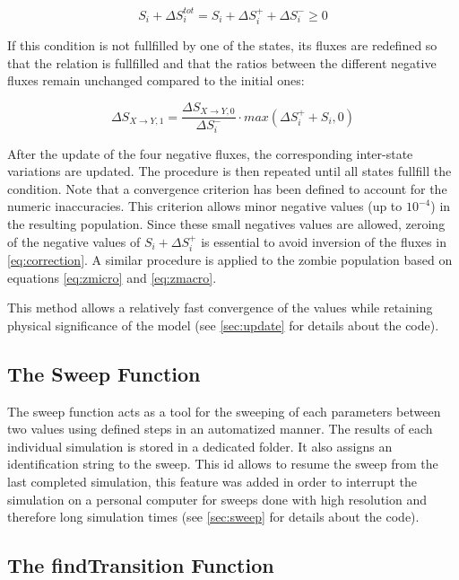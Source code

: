 \documentclass[11pt]{article} %
\begin{document}
\bigskip
\begin{equation} \label{eq:condition}
S_i + \Delta S_i^{tot} = S_i + \Delta S_i^+ + \Delta S_i^- \geq 0
\end{equation}
\bigskip

If this condition is not fullfilled by one of the states, its fluxes are redefined so that the relation is fullfilled and that the ratios between the different negative fluxes remain unchanged compared to the initial ones:

\bigskip
\begin{equation} \label{eq:correction}
\Delta S_{X\rightarrow Y,1} = \frac{\Delta S_{X\rightarrow Y,0}}{\Delta S_i^-}\cdot max(\Delta S_i^+ + S_i, 0)
\end{equation}
\bigskip

After the update of the four negative fluxes, the corresponding inter-state variations are updated. The procedure is then repeated until all states fullfill the condition. Note that a convergence criterion has been defined to account for the numeric inaccuracies. This criterion allows minor negative values (up to $10^{-4}$) in the resulting population. Since these small negatives values are allowed, zeroing of the negative values of $S_i + \Delta S_i^+$ is essential to avoid inversion of the fluxes in \eqref{eq:correction}. A similar procedure is applied to the zombie population based on equations \eqref{eq:zmicro} and \eqref{eq:zmacro}.

This method allows a relatively fast convergence of the values while retaining physical significance of the model (see \ref{sec:update} for details about the code).



\subsection{The Sweep Function}\indent

The sweep function acts as a tool for the sweeping of each parameters between two values using defined steps in an automatized manner. The results of each individual simulation is stored in a dedicated folder. It also assigns an identification string to the sweep. This id allows to resume the sweep from the last completed simulation, this feature was added in order to interrupt the simulation on a personal computer for sweeps done with high resolution and therefore long simulation times (see \ref{sec:sweep} for details about the code).


\subsection{The findTransition Function}\indent
\label{sec:findTransition}
\end{document}
